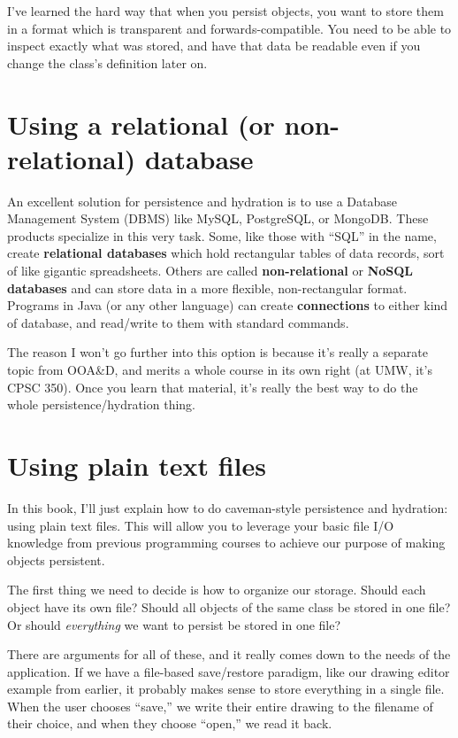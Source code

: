 I've learned the hard way that when you persist objects, you want to store
them in a format which is transparent and forwards-compatible. You need to be
able to inspect exactly what was stored, and have that data be readable even
if you change the class's definition later on.

\section{Using a relational (or non-relational) database}

An excellent solution for persistence and hydration is to use a Database
Management System (DBMS) like MySQL, PostgreSQL, or MongoDB. These products
specialize in this very task. Some, like those with ``SQL'' in the name,
create \textbf{relational databases} which hold rectangular tables of data
records, sort of like gigantic spreadsheets. Others are called
\textbf{non-relational} or \textbf{NoSQL databases} and can store data in a
more flexible, non-rectangular format. Programs in Java (or any other
language) can create \textbf{connections} to either kind of database, and
read/write to them with standard commands.

The reason I won't go further into this option is because it's really a
separate topic from OOA\&D, and merits a whole course in its own right (at
UMW, it's CPSC 350). Once you learn that material, it's really the best way to
do the whole persistence/hydration thing.

\section{Using plain text files}

In this book, I'll just explain how to do caveman-style persistence and
hydration: using plain text files. This will allow you to leverage your basic
file I/O knowledge from previous programming courses to achieve our purpose of
making objects persistent.

The first thing we need to decide is how to organize our storage. Should each
object have its own file? Should all objects of the same class be stored in
one file? Or should \textit{everything} we want to persist be stored in one
file?

There are arguments for all of these, and it really comes down to the needs of
the application. If we have a file-based save/restore paradigm, like our
drawing editor example from earlier, it probably makes sense to store
everything in a single file. When the user chooses ``save,'' we write their
entire drawing to the filename of their choice, and when they choose ``open,''
we read it back.

